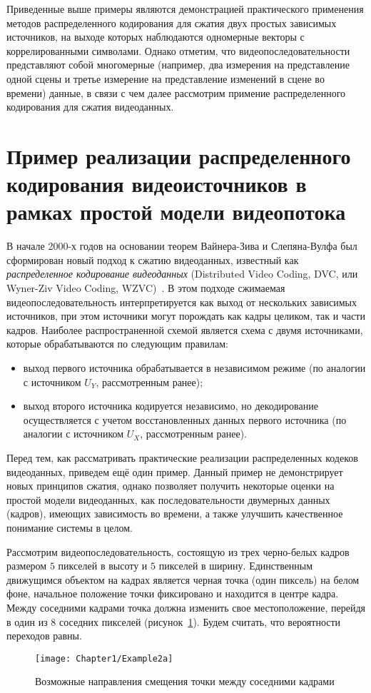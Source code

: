 Приведенные выше примеры являются демонстрацией практического применения методов распределенного кодирования для сжатия двух простых зависимых источников, на выходе которых наблюдаются одномерные векторы с коррелированными символами. Однако отметим, что видеопоследовательности представляют собой многомерные (например, два измерения на представление одной сцены и третье измерение на представление изменений в сцене во времени) данные, в связи с чем далее рассмотрим примение распределенного кодирования для сжатия видеоданных.

\section{Пример реализации распределенного кодирования видеоисточников в рамках простой модели видеопотока}
\label{chap1:3}

В начале 2000-х годов на основании теорем Вайнера-Зива и Слепяна-Вулфа был сформирован новый подход к сжатию видеоданных, известный как \emph{распределенное кодирование видеоданных} (Distributed Video Coding, DVC, или Wyner-Ziv Video Coding, WZVC)~\cite{1197184}. В этом подходе сжимаемая видеопоследовательность интерпретируется как выход от нескольких зависимых источников, при этом источники могут порождать как кадры целиком, так и части кадров. Наиболее распространенной схемой является схема с двумя источниками, которые обрабатываются по следующим правилам:
\begin{itemize}
\item выход первого источника обрабатывается в независимом режиме (по аналогии с источником $U_Y$, рассмотренным ранее);
\item выход второго источника кодируется независимо, но декодирование осуществляется с учетом восстановленных данных первого источника (по аналогии с источником $U_X$, рассмотренным ранее).
\end{itemize}

Перед тем, как рассматривать практические реализации распределенных кодеков видеоданных, приведем ещё один пример. Данный пример не демонстрирует новых принципов сжатия, однако позволяет получить некоторые оценки на простой модели видеоданных, как последовательности двумерных данных (кадров), имеющих зависимость во времени, а также улучшить качественное понимание системы в целом.

Рассмотрим видеопоследовательность, состоящую из трех черно-белых кадров размером $5$ пикселей в высоту и $5$ пикселей в ширину. Единственным движущимся объектом на кадрах является черная точка (один пиксель) на белом фоне, начальное положение точки фиксировано и находится в центре кадра. Между соседними кадрами точка должна изменить свое местоположение, перейдя в один из 8 соседних пикселей (рисунок~\ref{fig:Example2a}). Будем считать, что вероятности переходов равны.
\begin{figure}[htbp]
\begin{center}
\texttt{[image: Chapter1/Example2a]}
\caption{Возможные направления смещения точки между соседними кадрами}
\label{fig:Example2a}
\end{center}
\end{figure}

